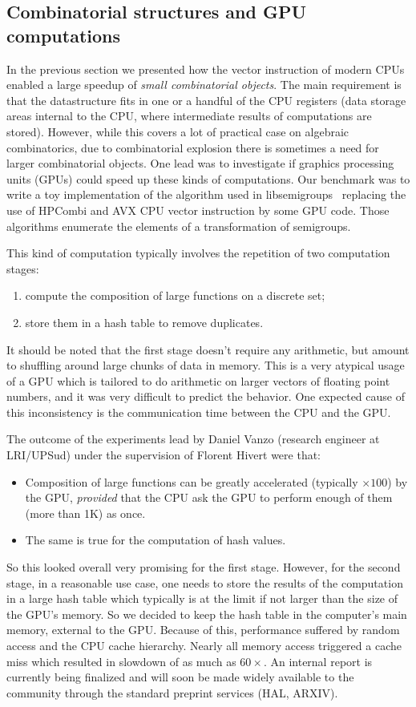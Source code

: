 \documentclass{deliverablereport}
\begin{document}
\subsection{Combinatorial structures and GPU computations}

In the previous section we presented how the vector instruction of modern
CPUs enabled a large speedup of \emph{small combinatorial
  objects}. The main requirement is that the datastructure fits in one or a
handful of the CPU registers (data storage areas internal to the CPU, where
intermediate results of computations are stored). However, while this
covers a lot of practical case on algebraic combinatorics, due to combinatorial
explosion there is sometimes a
need for larger combinatorial objects. One lead was to investigate if graphics
processing units (GPUs) could speed up these kinds of computations. Our benchmark was to write a
toy implementation of the algorithm used in libsemigroups~\cite{libsemigroups}
replacing the use of HPCombi and AVX CPU vector instruction by some GPU
code. Those algorithms enumerate the elements of a transformation of semigroups.

This kind of computation typically involves the repetition of two computation
stages:
\begin{enumerate}
\item compute the composition of large functions on a discrete set;
\item store them in a hash table to remove duplicates.
\end{enumerate}
It should be noted that the first stage doesn't require any arithmetic, but
amount to shuffling around large chunks of data in memory. This is a very atypical usage of a
GPU which is tailored to do arithmetic on larger vectors of floating point numbers, and it was very difficult
to predict the behavior. One expected cause of this inconsistency is the communication time
between the CPU and the GPU.
\medskip

The outcome of the experiments lead by Daniel Vanzo (research engineer at
LRI/UPSud) under the supervision of Florent Hivert were that:
\begin{itemize}
\item Composition of large functions can be greatly accelerated (typically
$\times 100$) by the GPU, \emph{provided} that the CPU ask the GPU to perform
enough of them (more than 1K) as once.
\item The same is true for the computation of hash values.
\end{itemize}
So this looked overall very promising for the first stage. However, for the
second stage, in a reasonable use case, one needs to store the results of the
computation in a large hash table which typically is at the limit if not
larger than the size of the GPU's memory. So we decided to keep the hash table in
the computer's main memory, external to the GPU. Because of this, performance
suffered by random access and the CPU cache hierarchy. Nearly all memory access
triggered a cache miss which resulted in slowdown of
as much as $60\times$. An internal  report is currently being finalized
and will soon be made widely available to the community through the standard
preprint services (HAL, ARXIV).
\bigskip
\end{document}
